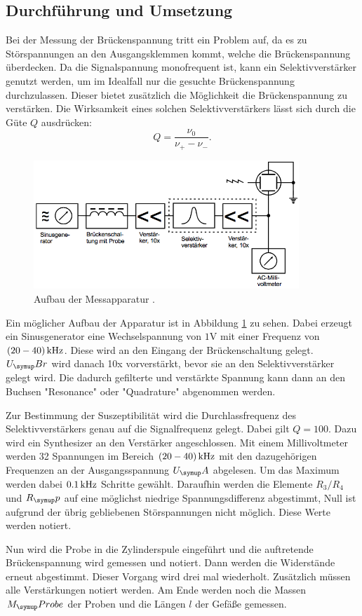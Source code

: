\subsection{Durchführung und Umsetzung}
Bei der Messung der Brückenspannung tritt ein Problem auf, da es zu Störspannungen
an den Ausgangsklemmen kommt, welche die Brückenspannung überdecken. Da die
Signalspannung monofrequent ist, kann ein Selektivverstärker genutzt werden,
um im Idealfall nur die gesuchte Brückenspannung durchzulassen. Dieser bietet
zusätzlich die Möglichkeit die Brückenspannung zu verstärken. Die Wirksamkeit
eines solchen Selektivverstärkers lässt sich durch die Güte $Q$ ausdrücken:
\begin{equation}
  Q = \frac{\nu_0}{\nu_+ - \nu_-}.
  \label{eqn:güte}
\end{equation}
\begin{figure}
  \centering
  \includegraphics[width=10cm]{bilder/aufbau.png}
  \caption{Aufbau der Messapparatur \cite{606}.}
  \label{fig:aufbau}
\end{figure}
Ein möglicher Aufbau der Apparatur ist in Abbildung \ref{fig:aufbau} zu sehen.
Dabei erzeugt ein Sinusgenerator eine Wechselspannung von $1 \si{\volt}$ mit
einer Frequenz von $(20-40) \,\si{\kilo\hertz}$. Diese wird an den Eingang der Brückenschaltung
gelegt. $U_\su{Br}$ wird danach 10x vorverstärkt, bevor sie an den Selektivverstärker
gelegt wird.
Die dadurch gefilterte und verstärkte Spannung kann dann an den Buchsen "Resonance"
oder "Quadrature" abgenommen werden.

Zur Bestimmung der Suszeptibilität wird die Durchlassfrequenz des Selektivverstärkers
genau auf die Signalfrequenz gelegt. Dabei gilt $Q = 100$. Dazu wird ein Synthesizer
an den Verstärker angeschlossen. Mit einem Millivoltmeter werden 32 Spannungen
im Bereich $(20-40) \,\si{\kilo\hertz}$ mit den dazugehörigen Frequenzen an der Ausgangsspannung
$U_\su{A}$ abgelesen. Um das Maximum werden dabei $0.1 \,\si{\kilo\hertz}$ Schritte gewählt.
Daraufhin werden die Elemente $R_3 / R_4$ und $R_\su{p}$ auf eine möglichst niedrige
Spannungsdifferenz abgestimmt, Null ist aufgrund der übrig gebliebenen Störspannungen
nicht möglich. Diese Werte werden notiert.

Nun wird die Probe in die Zylinderspule eingeführt und die auftretende Brückenspannung
wird gemessen und notiert. Dann werden die Widerstände erneut abgestimmt.
Dieser Vorgang wird drei mal wiederholt. Zusätzlich müssen alle Verstärkungen
notiert werden. Am Ende werden noch die Massen $M_\su{Probe}$ der Proben und die Längen $l$ der
Gefäße gemessen.
